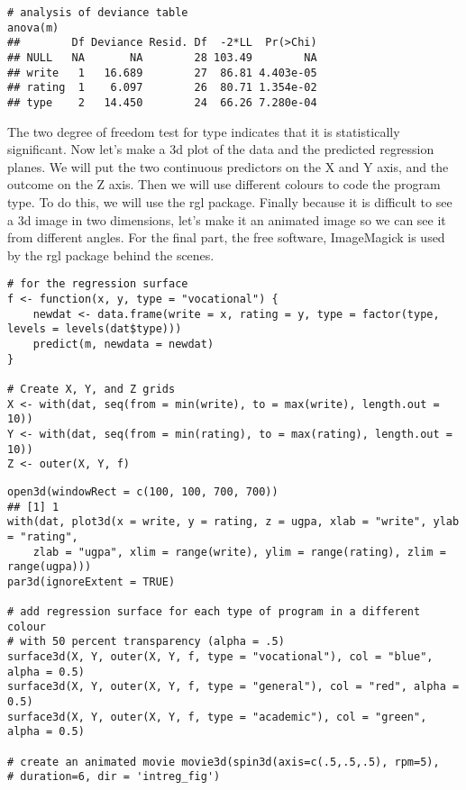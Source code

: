 \documentclass[a4paper,12pt]{article}
\begin{document}
\begin{framed}
\begin{verbatim}
# analysis of deviance table
anova(m)
##        Df Deviance Resid. Df  -2*LL  Pr(>Chi)
## NULL   NA       NA        28 103.49        NA
## write   1   16.689        27  86.81 4.403e-05
## rating  1    6.097        26  80.71 1.354e-02
## type    2   14.450        24  66.26 7.280e-04
\end{verbatim}
\end{framed}
The two degree of freedom test for type indicates that it is statistically significant.
Now let's make a 3d plot of the data and the predicted regression planes. We will put the two continuous predictors on the X and Y axis, and the outcome on the Z axis. Then we will use different colours to code the program type. To do this, we will use the rgl package. Finally because it is difficult to see a 3d image in two dimensions, let's make it an animated image so we can see it from different angles. For the final part, the free software, ImageMagick is used by the rgl package behind the scenes.
\begin{framed}
\begin{verbatim}
# for the regression surface
f <- function(x, y, type = "vocational") {
    newdat <- data.frame(write = x, rating = y, type = factor(type, levels = levels(dat$type)))
    predict(m, newdata = newdat)
}

# Create X, Y, and Z grids
X <- with(dat, seq(from = min(write), to = max(write), length.out = 10))
Y <- with(dat, seq(from = min(rating), to = max(rating), length.out = 10))
Z <- outer(X, Y, f)
\end{verbatim}
\end{framed}
\begin{framed}
\begin{verbatim}
open3d(windowRect = c(100, 100, 700, 700))
## [1] 1
with(dat, plot3d(x = write, y = rating, z = ugpa, xlab = "write", ylab = "rating", 
    zlab = "ugpa", xlim = range(write), ylim = range(rating), zlim = range(ugpa)))
par3d(ignoreExtent = TRUE)

# add regression surface for each type of program in a different colour
# with 50 percent transparency (alpha = .5)
surface3d(X, Y, outer(X, Y, f, type = "vocational"), col = "blue", alpha = 0.5)
surface3d(X, Y, outer(X, Y, f, type = "general"), col = "red", alpha = 0.5)
surface3d(X, Y, outer(X, Y, f, type = "academic"), col = "green", alpha = 0.5)

# create an animated movie movie3d(spin3d(axis=c(.5,.5,.5), rpm=5),
# duration=6, dir = 'intreg_fig')
\end{verbatim}
\end{framed}
\end{document}
